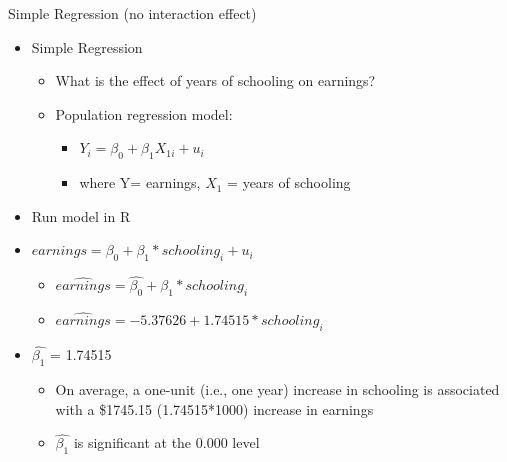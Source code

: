 \documentclass[8pt,ignorenonframetext,dvipsnames]{beamer}
\providecommand{\tightlist}{%
  \setlength{\itemsep}{0pt}\setlength{\parskip}{0pt}}
\let\olditem\item
\renewcommand{\item}{%
  \olditem\vspace{4pt}
}
\begin{document}
\begin{frame}{Simple Regression (no interaction effect)}
\protect\hypertarget{simple-regression-no-interaction-effect}{}

\begin{itemize}
\tightlist
\item
  Simple Regression

  \begin{itemize}
  \tightlist
  \item
    What is the effect of years of schooling on earnings?
  \item
    Population regression model:

    \begin{itemize}
    \tightlist
    \item
      \(Y_i = \beta_0 + \beta_1X_{1i} + u_i\)
    \item
      where Y= earnings, \(X_{1}\) = years of schooling
    \end{itemize}
  \end{itemize}
\item
  Run model in R
\item
  \(earnings = \beta_0 + \beta_1*schooling_{i} + u_i\)

  \begin{itemize}
  \tightlist
  \item
    \(\hat{earnings} = \hat{\beta_0} + \hat{\beta_1}*schooling_{i}\)
  \item
    \(\hat{earnings} = -5.37626 + 1.74515*schooling_{i}\)
  \end{itemize}
\item
  \(\hat{\beta_1}\) = 1.74515

  \begin{itemize}
  \tightlist
  \item
    On average, a one-unit (i.e., one year) increase in schooling is
    associated with a \$1745.15 (1.74515*1000) increase in earnings
  \item
    \(\hat{\beta_1}\) is significant at the 0.000 level
  \end{itemize}
\end{itemize}

\end{frame}
\end{document}
